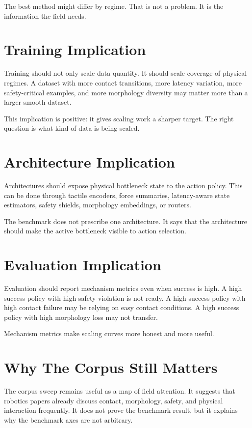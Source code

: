 The best method might differ by regime. That is not a problem. It is the information the field needs.

\section{Training Implication}

Training should not only scale data quantity. It should scale coverage of physical regimes. A dataset with more contact transitions, more latency variation, more safety-critical examples, and more morphology diversity may matter more than a larger smooth dataset.

This implication is positive: it gives scaling work a sharper target. The right question is what kind of data is being scaled.

\section{Architecture Implication}

Architectures should expose physical bottleneck state to the action policy. This can be done through tactile encoders, force summaries, latency-aware state estimators, safety shields, morphology embeddings, or routers.

The benchmark does not prescribe one architecture. It says that the architecture should make the active bottleneck visible to action selection.

\section{Evaluation Implication}

Evaluation should report mechanism metrics even when success is high. A high success policy with high safety violation is not ready. A high success policy with high contact failure may be relying on easy contact conditions. A high success policy with high morphology loss may not transfer.

Mechanism metrics make scaling curves more honest and more useful.

\section{Why The Corpus Still Matters}

The corpus sweep remains useful as a map of field attention. It suggests that robotics papers already discuss contact, morphology, safety, and physical interaction frequently. It does not prove the benchmark result, but it explains why the benchmark axes are not arbitrary.

